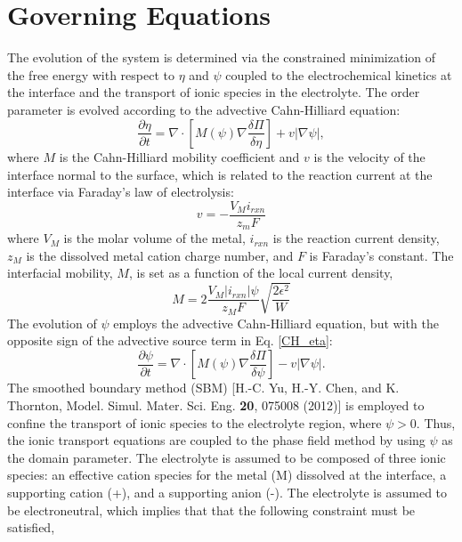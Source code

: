 \documentclass[11pt]{article}
\renewcommand{\=}[1]{\stackrel{#1}{=}} %
\theoremstyle{definition}
\theoremstyle{remark}
\begin{document}
\section{Governing Equations}
The evolution of the system is determined via the constrained minimization of the free energy with respect to $\eta$  and  $\psi$ coupled to the electrochemical kinetics at the interface and the transport of ionic species in the electrolyte. The order parameter is evolved according to the advective Cahn-Hilliard equation:
\begin{equation}
\label{CH_eta}
 \frac{\partial \eta}{\partial t} = \nabla \cdot \left[ M(\psi) \nabla \frac{\delta \Pi}{\delta \eta}\right] + v |\nabla \psi|,
 \end{equation}
\noindent where $M$ is the Cahn-Hilliard mobility coefficient and $v$ is the velocity of the interface normal to the surface, which is related to the reaction current at the interface via Faraday's law of electrolysis:
\begin{equation}
\label{int_vel}
v=-\frac{V_M i_{rxn}}{z_m F}
 \end{equation}
\noindent where $V_M$ is the molar volume of the metal, $i_{rxn}$ is the reaction current density, $z_M$ is the dissolved metal cation charge number, and $F$ is Faraday's constant. The interfacial mobility, $M$, is set as a function of the local current density,
\begin{equation}
M=2\frac{V_M |i_{rxn}| \psi}{z_M F}\sqrt{\frac{2 \epsilon^2}{W}}
\end{equation}
The evolution of $\psi$ employs the advective Cahn-Hilliard equation, but with the opposite sign of the advective source term in Eq. \eqref{CH_eta}:
\begin{equation}
\label{CH_psi}
 \frac{\partial \psi}{\partial t} = \nabla \cdot \left[ M(\psi) \nabla \frac{\delta \Pi}{\delta \psi} \right] - v |\nabla \psi|.
 \end{equation}
 The smoothed boundary method (SBM)  [H.-C. Yu, H.-Y. Chen, and K. Thornton, Model. Simul. Mater. Sci. Eng. {\bf 20}, 075008
(2012)] is employed to confine the transport of ionic species to the electrolyte region, where $\psi > 0$. Thus, the ionic transport equations are coupled to the phase field method by using  $\psi$ as the domain parameter. The electrolyte is assumed to be composed of three ionic species: an effective cation species for the metal (M) dissolved at the interface, a supporting cation (+), and a supporting anion (-). The electrolyte is assumed to be electroneutral, which implies that that the following constraint must be satisfied,
\end{document}

